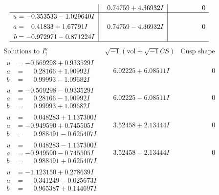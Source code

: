 \documentclass[1p]{elsarticle_modified}
\theoremstyle{definition}
\newcommand{\I}{\sqrt{-1}}
\begin{document}
$$\begin{array}{c|c|c}
 & \phantom{-}0.74759 + 4.36932 I & \phantom{-0.000000 } 0 \\ \hline\begin{aligned}
u &= -0.353533 - 1.029640 I \\
a &= \phantom{-}0.41833 + 1.67791 I \\
b &= -0.972971 - 0.871224 I\end{aligned}
 & \phantom{-}0.74759 - 4.36932 I & \phantom{-0.000000 } 0\\
 \hline 
 \end{array}$$\newpage$$\begin{array}{c|c|c}  
\text{Solutions to }I^u_{1}& \I (\text{vol} + \sqrt{-1}CS) & \text{Cusp shape}\\
 \hline 
\begin{aligned}
u &= -0.569298 + 0.933529 I \\
a &= \phantom{-}0.28166 + 1.90992 I \\
b &= \phantom{-}0.99993 - 1.09682 I\end{aligned}
 & \phantom{-}6.02225 + 6.08511 I & \phantom{-0.000000 } 0 \\ \hline\begin{aligned}
u &= -0.569298 - 0.933529 I \\
a &= \phantom{-}0.28166 - 1.90992 I \\
b &= \phantom{-}0.99993 + 1.09682 I\end{aligned}
 & \phantom{-}6.02225 - 6.08511 I & \phantom{-0.000000 } 0 \\ \hline\begin{aligned}
u &= \phantom{-}0.048283 + 1.137300 I \\
a &= -0.949590 + 0.745505 I \\
b &= \phantom{-}0.988491 - 0.625407 I\end{aligned}
 & \phantom{-}3.52458 + 2.13444 I & \phantom{-0.000000 } 0 \\ \hline\begin{aligned}
u &= \phantom{-}0.048283 - 1.137300 I \\
a &= -0.949590 - 0.745505 I \\
b &= \phantom{-}0.988491 + 0.625407 I\end{aligned}
 & \phantom{-}3.52458 - 2.13444 I & \phantom{-0.000000 } 0 \\ \hline\begin{aligned}
u &= -1.123150 + 0.278639 I \\
a &= \phantom{-}0.341249 - 0.025673 I \\
b &= \phantom{-}0.965387 + 0.144697 I\end{aligned}

\end{array}$$
\end{document}
